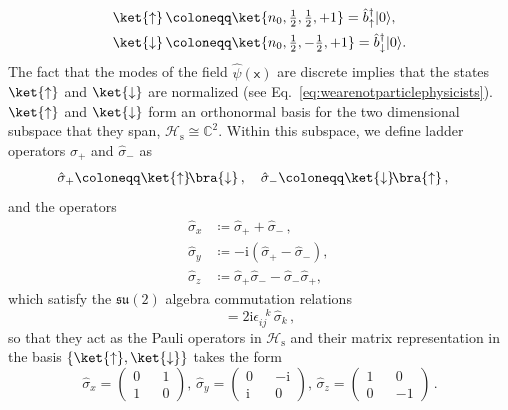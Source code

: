 \documentclass[letterpaper,12pt,titlepage,oneside,final]{book}
\newcommand{\mf}{\mathsf}%
\newcommand{\ii}{\mathrm{i}}
\begin{document}
\begin{equation}
\begin{aligned}\label{uparrowdownarrowstates}
    \ket{\uparrow}\, &\coloneqq  \ket{n_0,\tfrac{1}{2},\tfrac{1}{2},+1} = \hat{b}^\dagger_{\uparrow}|0\rangle ,\\
    \ket{\downarrow}\, &\coloneqq  \ket{n_0,\tfrac{1}{2},-\tfrac{1}{2},+1} = \hat{b}^\dagger_{\downarrow}|0\rangle  .
    \end{aligned}
\end{equation}
The fact that the modes of the field $\hat{\psi}(\mf x)$ are discrete implies that the states $\ket{\uparrow}$ and $\ket{\downarrow}$ are normalized (see Eq.~\eqref{eq:wearenotparticlephysicists}). $\ket{\uparrow}$ and $\ket{\downarrow}$ form an orthonormal basis for the two dimensional subspace that they span, $\mathscr{H}_\text{s}\cong \mathbb{C}^2$. Within this subspace, we define ladder operators $\hat{\sigma}_+$ and $\hat{\sigma}_-$ as
\begin{align}
    \hat{\sigma}_+ &\coloneqq \ket{\uparrow}\!\bra{\downarrow}\,, \quad \hat{\sigma}_- \coloneqq \ket{\downarrow}\!\bra{\uparrow} \,,
\end{align}
and the operators 
\begin{align}
    \hat{\sigma}_x &\coloneqq \hat{\sigma}_+ + \hat{\sigma}_- \,,\\
    \hat{\sigma}_y &\coloneqq -\ii(\hat{\sigma}_+ - \hat{\sigma}_-), \,\\
    \hat{\sigma}_z &\coloneqq \hat{\sigma}_+ \hat{\sigma}_- - \hat{\sigma}_-\hat{\sigma}_+,
\end{align}
which satisfy the $\mathfrak{su}(2)$ algebra commutation relations
\begin{equation}
    [\hat{\sigma}_i, \hat{\sigma}_j] = 2\ii\epsilon_{ij}^{\,\,\,\,k}\,\hat{\sigma}_{k} \, ,
\end{equation}
so that they act as the Pauli operators in $\mathscr{H}_\text{s}$ and their matrix representation in the basis $\{\ket{\uparrow},\ket{\downarrow}\}$ takes the form
\begin{equation}
    \hat{\sigma}_x = \begin{pmatrix}
        0&&1\\
        1&&0
    \end{pmatrix} ,\, \hat{\sigma}_y =\begin{pmatrix}
        0&&-\ii\\
        \ii&&0
    \end{pmatrix},\,
    \hat{\sigma}_z  = \begin{pmatrix}
        1&&0\\
        0&&-1
    \end{pmatrix}\,.
\end{equation}
\end{document}

